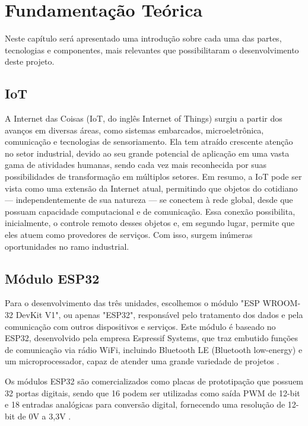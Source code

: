 \section{Fundamentação Teórica}
Neste capítulo será apresentado uma introdução sobre cada uma das partes, tecnologias e componentes, mais relevantes que possibilitaram o desenvolvimento deste projeto.

\subsection{IoT}
A Internet das Coisas (IoT, do inglês Internet of Things) surgiu a partir dos avanços em diversas áreas, como sistemas embarcados, microeletrônica, comunicação e tecnologias de sensoriamento. Ela tem atraído crescente atenção no setor industrial, devido ao seu grande potencial de aplicação em uma vasta gama de atividades humanas, sendo cada vez mais reconhecida por suas possibilidades de transformação em múltiplos setores. Em resumo, a IoT pode ser vista como uma extensão da Internet atual, permitindo que objetos do cotidiano — independentemente de sua natureza — se conectem à rede global, desde que possuam capacidade computacional e de comunicação. Essa conexão possibilita, inicialmente, o controle remoto desses objetos e, em segundo lugar, permite que eles atuem como provedores de serviços. Com isso, surgem inúmeras oportunidades no ramo industrial. \cite{santos2016internet}

\subsection{Módulo ESP32}
Para o desenvolvimento das três unidades, escolhemos o módulo "ESP WROOM-32 DevKit V1", ou apenas "ESP32", responsável pelo tratamento dos dados e pela comunicação com outros dispositivos e serviços. Este módulo é baseado no ESP32, desenvolvido pela empresa Espressif Systems, que traz embutido funções de comunicação via rádio WiFi, incluindo Bluetooth LE (Bluetooth low-energy) e um microprocessador, capaz de atender uma grande variedade de projetos \cite{gadelha2020sistema}.

Os módulos ESP32 são comercializados como placas de prototipação que possuem 32 portas digitais, sendo que 16 podem ser utilizadas como saída PWM de 12-bit e 18 entradas analógicas para conversão digital, fornecendo uma resolução de 12-bit de 0V a 3,3V \cite{espressif}.

